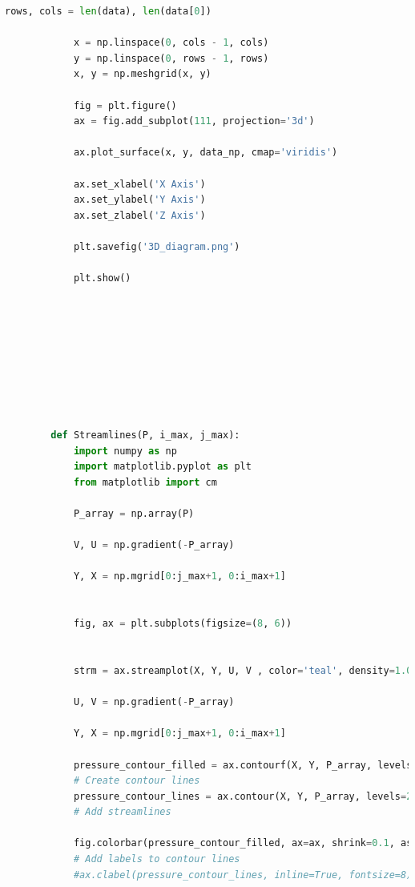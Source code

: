 \documentclass[12pt]{article}
\begin{document}
\begin{scriptsize}
\begin{lstlisting}[language=python,caption={Python code-Potential Flow}]
            rows, cols = len(data), len(data[0])
        
            x = np.linspace(0, cols - 1, cols)
            y = np.linspace(0, rows - 1, rows)
            x, y = np.meshgrid(x, y)
        
            fig = plt.figure()
            ax = fig.add_subplot(111, projection='3d')
        
            ax.plot_surface(x, y, data_np, cmap='viridis')
        
            ax.set_xlabel('X Axis')
            ax.set_ylabel('Y Axis')
            ax.set_zlabel('Z Axis')
        
            plt.savefig('3D_diagram.png')
        
            plt.show()
        
        
        
        
        
        
        
        
        
        def Streamlines(P, i_max, j_max):
            import numpy as np
            import matplotlib.pyplot as plt
            from matplotlib import cm
        
            P_array = np.array(P)
        
            V, U = np.gradient(-P_array)
        
            Y, X = np.mgrid[0:j_max+1, 0:i_max+1]
        
        
            fig, ax = plt.subplots(figsize=(8, 6))
        
        
            strm = ax.streamplot(X, Y, U, V , color='teal', density=1.0, arrowstyle='->', arrowsize=1.5)
        
            U, V = np.gradient(-P_array)
        
            Y, X = np.mgrid[0:j_max+1, 0:i_max+1]
        
            pressure_contour_filled = ax.contourf(X, Y, P_array, levels=200, cmap=cm.viridis, alpha=0.9)
            # Create contour lines
            pressure_contour_lines = ax.contour(X, Y, P_array, levels=200, colors='black', linewidths=0.5)
            # Add streamlines
            
            fig.colorbar(pressure_contour_filled, ax=ax, shrink=0.1, aspect=5, label='Pressure')
            # Add labels to contour lines
            #ax.clabel(pressure_contour_lines, inline=True, fontsize=8)
        

\end{lstlisting}
\end{scriptsize}
\end{document}
